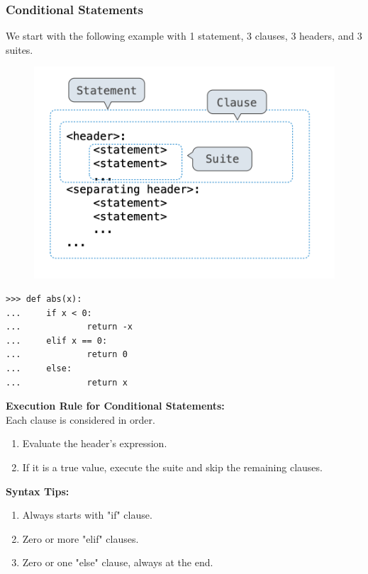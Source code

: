 \documentclass[11pt]{article}
\begin{document}
\subsubsection{Conditional Statements}
We start with the following example with 1 statement, 3 clauses, 3 headers, and 3 suites. 
\begin{figure}[h]
\includegraphics[scale=1]{statement} 
\centering
\end{figure}
\begin{lstlisting}
>>> def abs(x): 
...     if x < 0: 
...             return -x
...     elif x == 0:
...             return 0
...     else:
...             return x
\end{lstlisting}
\textbf{Execution Rule for Conditional Statements:} \\
Each clause is considered in order. 
\begin{enumerate}
\item Evaluate the header's expression. 
\item If it is a true value, execute the suite and skip the remaining clauses.
\end{enumerate}
\textbf{Syntax Tips:}
\begin{enumerate}
\item Always starts with "if" clause. 
\item Zero or more "elif" clauses. 
\item Zero or one "else" clause, always at the end.  
\end{enumerate}
\end{document}

